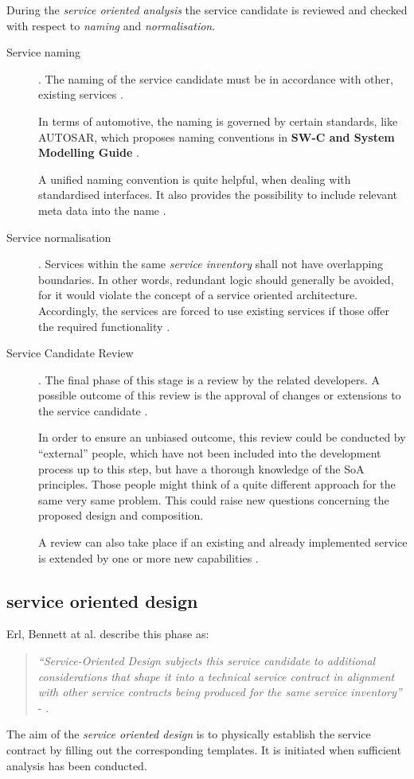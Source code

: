 During the \emph{service oriented analysis} the service candidate is reviewed and checked with respect to \emph{naming} and \emph{normalisation}.

\begin{description}
	\item [Service naming] .
	The naming of the service candidate must be in accordance with other, existing services \cite[p.206]{erl2011}.

	In terms of automotive, the naming is governed by certain standards, like AUTOSAR, which proposes naming conventions in \textbf{SW-C and System Modelling Guide} \cite{autosar_system_modelling}.

	A unified naming convention is quite helpful, when dealing with standardised interfaces. It also provides the possibility to include relevant meta data into the name \cite{rehner2013}.

	\item [Service normalisation] .
	Services within the same \emph{service inventory} shall not have overlapping boundaries. In other words, redundant logic should generally be avoided, for it would violate the concept of a service oriented architecture. Accordingly, the services are forced to use existing services if those offer the required functionality \cite[p.207]{erl2011}.

	\item [Service Candidate Review] .
	The final phase of this stage is a review by the related developers. A possible outcome of this review is the approval of changes or extensions to the service candidate \cite[p.210]{erl2011}.

	In order to ensure an unbiased outcome, this review could be conducted by ``external'' people, which have not been included into the development process up to this step, but have a thorough knowledge of the SoA principles. Those people might think of a quite different approach for the same very same problem. This could raise new questions concerning the proposed design and composition.

	A review can also take place if an existing and already implemented service is extended by one or more new capabilities \cite[p.210]{erl2011}.
\end{description}




\subsection{service oriented design}

Erl, Bennett at al. describe this phase as:
\begin{quote}
\emph{``Service-Oriented Design subjects this service candidate to additional considerations that shape it into a technical service contract in alignment with other service contracts being produced for the same service inventory''} - \cite[p.86]{erl2011}.
\end{quote}


The aim of the \emph{service oriented design} is to physically establish the service contract by filling out the corresponding templates. It is initiated when sufficient analysis has been conducted.